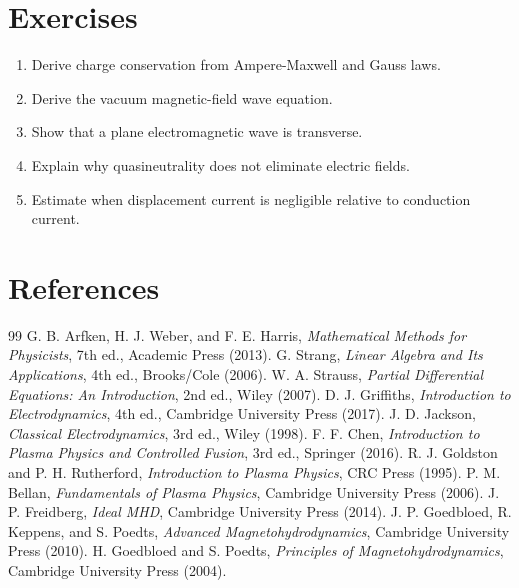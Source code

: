 \documentclass[11pt]{article}
\begin{document}
\section{Exercises}
\begin{enumerate}[leftmargin=1.8em]
\item Derive charge conservation from Ampere-Maxwell and Gauss laws.
\item Derive the vacuum magnetic-field wave equation.
\item Show that a plane electromagnetic wave is transverse.
\item Explain why quasineutrality does not eliminate electric fields.
\item Estimate when displacement current is negligible relative to conduction current.
\end{enumerate}

\section{References}
{\small
\begin{thebibliography}{99}
 G. B. Arfken, H. J. Weber, and F. E. Harris, \emph{Mathematical Methods for Physicists}, 7th ed., Academic Press (2013).
 G. Strang, \emph{Linear Algebra and Its Applications}, 4th ed., Brooks/Cole (2006).
 W. A. Strauss, \emph{Partial Differential Equations: An Introduction}, 2nd ed., Wiley (2007).
 D. J. Griffiths, \emph{Introduction to Electrodynamics}, 4th ed., Cambridge University Press (2017).
 J. D. Jackson, \emph{Classical Electrodynamics}, 3rd ed., Wiley (1998).
 F. F. Chen, \emph{Introduction to Plasma Physics and Controlled Fusion}, 3rd ed., Springer (2016).
 R. J. Goldston and P. H. Rutherford, \emph{Introduction to Plasma Physics}, CRC Press (1995).
 P. M. Bellan, \emph{Fundamentals of Plasma Physics}, Cambridge University Press (2006).
 J. P. Freidberg, \emph{Ideal MHD}, Cambridge University Press (2014).
 J. P. Goedbloed, R. Keppens, and S. Poedts, \emph{Advanced Magnetohydrodynamics}, Cambridge University Press (2010).
 H. Goedbloed and S. Poedts, \emph{Principles of Magnetohydrodynamics}, Cambridge University Press (2004).
\end{thebibliography}
}
\end{document}
